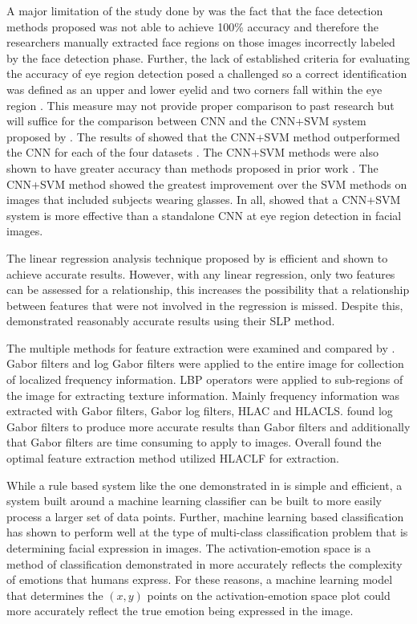 \documentclass{IEEEtran}
\begin{document}
A major limitation of the study done by \cite{yu2018eye} was the fact that the face detection methods proposed was not able to achieve 100\% accuracy and therefore the researchers manually extracted face regions on those images incorrectly labeled by the face detection phase. Further, the lack of established criteria for evaluating the accuracy of eye region detection posed a challenged so a correct identification was defined as an upper and lower eyelid and two corners fall within the eye region \cite{yu2018eye}. This measure may not provide proper comparison to past research but will suffice for the comparison between CNN and the CNN+SVM system proposed by \cite{yu2018eye}. The results of \cite{yu2018eye} showed that the CNN+SVM method outperformed the CNN for each of the four datasets \cite{yu2018eye}. The CNN+SVM methods were also shown to have greater accuracy than methods proposed in prior work \cite{yu2018eye}. The CNN+SVM method showed the greatest improvement over the SVM methods on images that included subjects wearing glasses. In all, \cite{yu2018eye} showed that a CNN+SVM system is more effective than a standalone CNN at eye region detection in facial images.


The linear regression analysis technique proposed by \cite{alazzawi2018performance} is efficient and shown to achieve accurate results. However, with any linear regression, only two features can be assessed for a relationship, this increases the possibility that a relationship between features that were not involved in the regression is missed. Despite this, \cite{alazzawi2018performance} demonstrated reasonably accurate results using their SLP method.
 
The multiple methods for feature extraction were examined and compared by \cite{lajevardi2012automatic}. Gabor filters and log Gabor filters were applied to the entire image for collection of localized frequency information. LBP operators were applied to sub-regions of the image for extracting texture information. Mainly frequency information was extracted with Gabor filters, Gabor log filters, HLAC and HLACLS. \cite{lajevardi2012automatic} found log Gabor filters to produce more accurate results than Gabor filters and additionally that Gabor filters are time consuming to apply to images. Overall \cite{lajevardi2012automatic} found the optimal feature extraction method utilized HLACLF for extraction.

While a rule based system like the one demonstrated in \cite{ioannou2007robust} is simple and efficient, a system built around a machine learning classifier can be built to more easily process a larger set of data points. Further, machine learning based classification has shown to perform well at the type of multi-class classification problem that is determining facial expression in images. The activation-emotion space is a method of classification demonstrated in \cite{ioannou2007robust} more accurately reflects the complexity of emotions that humans express. For these reasons, a machine learning model that determines the $(x,y)$ points on the activation-emotion space plot could more accurately reflect the true emotion being expressed in the image.
\end{document}
